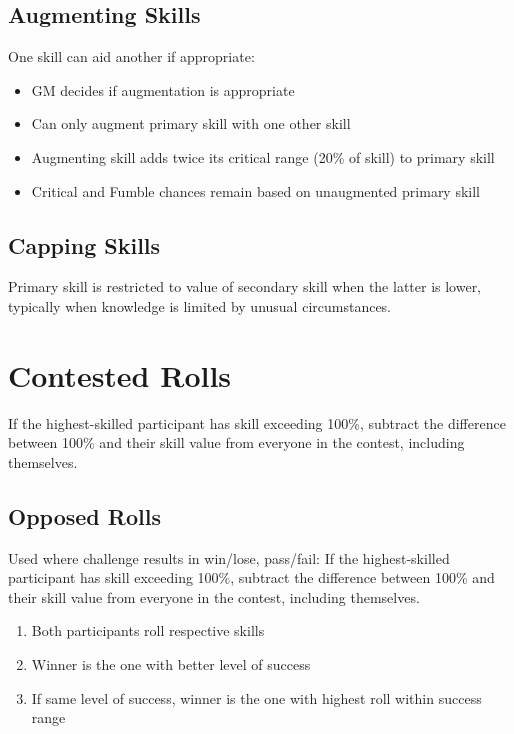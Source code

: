 \documentclass[10pt]{article}
\begin{document}
\subsection{Augmenting Skills}
\label{sec:augment}

One skill can aid another if appropriate:
\begin{itemize}
    \item GM decides if augmentation is appropriate
    \item Can only augment primary skill with one other skill
    \item Augmenting skill adds twice its critical range (20\% of skill) to primary skill
    \item Critical and Fumble chances remain based on unaugmented primary skill
\end{itemize}

\subsection{Capping Skills}
\label{sec:cap}

Primary skill is restricted to value of secondary skill when the latter is lower, typically when knowledge is limited by unusual circumstances.

\section{Contested Rolls}
If the highest-skilled participant has skill exceeding 100\%, subtract the difference between 100\% and their skill value from everyone in the contest, including themselves.


\subsection{Opposed Rolls}
\label{sec:opposed}

Used where challenge results in win/lose, pass/fail:
If the highest-skilled participant has skill exceeding 100\%, subtract the difference between 100\% and their skill value from everyone in the contest, including themselves.

\begin{enumerate}
    \item Both participants roll respective skills
    \item Winner is the one with better level of success
    \item If same level of success, winner is the one with highest roll within success range
\end{enumerate}
\end{document}
